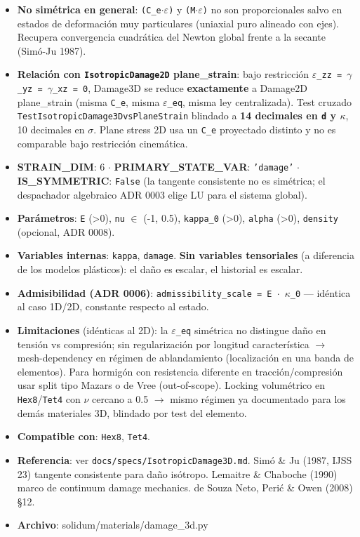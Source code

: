 \documentclass[11pt,letterpaper,oneside]{report}
\begin{document}
\begin{itemize}
  \item \textbf{No simétrica en general}: \texttt{(C\_e\ensuremath{\cdot}\ensuremath{\varepsilon})} y \texttt{(M\ensuremath{\cdot}\ensuremath{\varepsilon})} no son proporcionales salvo en estados de deformación muy particulares (uniaxial puro alineado con ejes). Recupera convergencia cuadrática del Newton global frente a la secante (Simó-Ju 1987).
  \item \textbf{Relación con \texttt{IsotropicDamage2D} plane\_strain}: bajo restricción \texttt{\ensuremath{\varepsilon}\_zz = \ensuremath{\gamma}\_yz = \ensuremath{\gamma}\_xz = 0}, Damage3D se reduce \textbf{exactamente} a Damage2D plane\_strain (misma \texttt{C\_e}, misma \texttt{\ensuremath{\varepsilon}\_eq}, misma ley centralizada). Test cruzado \texttt{TestIsotropicDamage3DvsPlaneStrain} blindado a \textbf{14 decimales en \texttt{d} y \texttt{\ensuremath{\kappa}}}, 10 decimales en \ensuremath{\sigma}. Plane stress 2D usa un \texttt{C\_e} proyectado distinto y no es comparable bajo restricción cinemática.
  \item \textbf{STRAIN\_DIM}: 6 \ensuremath{\cdot} \textbf{PRIMARY\_STATE\_VAR}: \texttt{'damage'} \ensuremath{\cdot} \textbf{IS\_SYMMETRIC}: \texttt{False} (la tangente consistente no es simétrica; el despachador algebraico ADR 0003 elige LU para el sistema global).
  \item \textbf{Parámetros}: \texttt{E} (>0), \texttt{nu} \ensuremath{\in} (-1, 0.5), \texttt{kappa\_0} (>0), \texttt{alpha} (>0), \texttt{density} (opcional, ADR 0008).
  \item \textbf{Variables internas}: \texttt{kappa}, \texttt{damage}. \textbf{Sin variables tensoriales} (a diferencia de los modelos plásticos): el daño es escalar, el historial es escalar.
  \item \textbf{Admisibilidad (ADR 0006)}: \texttt{admissibility\_scale = E \ensuremath{\cdot} \ensuremath{\kappa}\_0} --- idéntica al caso 1D/2D, constante respecto al estado.
  \item \textbf{Limitaciones} (idénticas al 2D): la \texttt{\ensuremath{\varepsilon}\_eq} simétrica no distingue daño en tensión vs compresión; sin regularización por longitud característica \ensuremath{\to} mesh-dependency en régimen de ablandamiento (localización en una banda de elementos). Para hormigón con resistencia diferente en tracción/compresión usar split tipo Mazars o de Vree (out-of-scope). Locking volumétrico en \texttt{Hex8}/\texttt{Tet4} con \texttt{\ensuremath{\nu}} cercano a 0.5 \ensuremath{\to} mismo régimen ya documentado para los demás materiales 3D, blindado por test del elemento.
  \item \textbf{Compatible con}: \texttt{Hex8}, \texttt{Tet4}.
  \item \textbf{Referencia}: ver \texttt{docs/specs/IsotropicDamage3D.md}. Simó \& Ju (1987, IJSS 23) tangente consistente para daño isótropo. Lemaitre \& Chaboche (1990) marco de continuum damage mechanics. de Souza Neto, Perić \& Owen (2008) §12.
  \item \textbf{Archivo}: solidum/materials/damage\_3d.py
\end{itemize}
\end{document}
